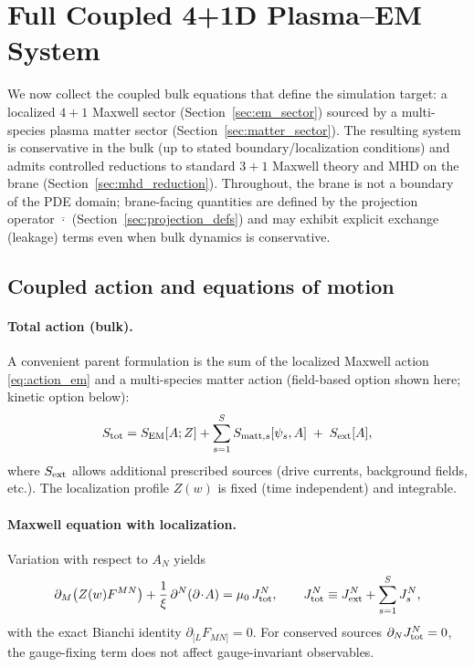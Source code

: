 \documentclass[11pt]{article}
\newcommand{\A}{A}              %
\newcommand{\F}{F}              %
\newcommand{\J}{J}              %
\newcommand{\Js}{J_s}           %
\newcommand{\Z}{Z}              %
\newcommand{\Proj}[1]{\overline{#1}} %
\newcommand{\muzero}{\mu_0}
\begin{document}
\section{Full Coupled 4+1D Plasma--EM System}
\label{sec:full_system}

We now collect the coupled bulk equations that define the simulation target: a
localized \(4+1\) Maxwell sector (Section~\ref{sec:em_sector}) sourced by a
multi-species plasma matter sector (Section~\ref{sec:matter_sector}). The resulting
system is conservative in the bulk (up to stated boundary/localization conditions)
and admits controlled reductions to standard \(3+1\) Maxwell theory and MHD on the
brane (Section~\ref{sec:mhd_reduction}). Throughout, the brane is not a boundary of
the PDE domain; brane-facing quantities are defined by the projection operator
\(\Proj{\cdot}\) (Section~\ref{sec:projection_defs}) and may exhibit explicit
exchange (leakage) terms even when bulk dynamics is conservative.

\subsection{Coupled action and equations of motion}
\label{sec:coupled_action_eom}

\paragraph{Total action (bulk).}
A convenient parent formulation is the sum of the localized Maxwell action
\eqref{eq:action_em} and a multi-species matter action (field-based option shown
here; kinetic option below):
\begin{equation}
S_{\rm tot}
=
S_{\rm EM}[\A;\Z]
+
\sum_{s=1}^S S_{{\rm matt},s}[\psi_s,\A]
\;+\;
S_{\rm ext}[\A],
\label{eq:action_total}
\end{equation}
where \(S_{\rm ext}\) allows additional prescribed sources (drive currents,
background fields, etc.). The localization profile \(\Z(w)\) is fixed (time
independent) and integrable.

\paragraph{Maxwell equation with localization.}
Variation with respect to \(\A_N\) yields
\begin{equation}
\partial_M\!\left(\Z(w)\F^{MN}\right)
+\frac{1}{\xi}\,\partial^N(\partial\!\cdot\!\A)
=\muzero\,\J_{\rm tot}^N,
\qquad
\J_{\rm tot}^N \equiv \J_{\rm ext}^N + \sum_{s=1}^S \Js^N,
\label{eq:maxwell_full}
\end{equation}
with the exact Bianchi identity \(\partial_{[L}\F_{MN]}=0\).
For conserved sources \(\partial_N\J_{\rm tot}^N=0\), the gauge-fixing term does not
affect gauge-invariant observables.
\end{document}
